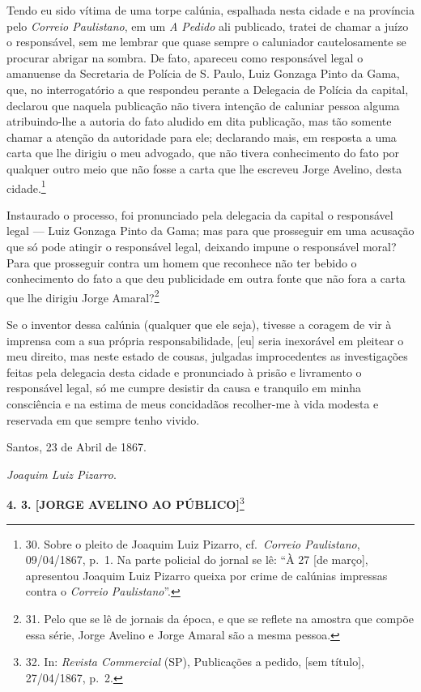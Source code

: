 Tendo eu sido vítima de uma torpe calúnia, espalhada nesta cidade e na
província pelo \emph{Correio Paulistano}, em um \emph{A Pedido} ali
publicado, tratei de chamar a juízo o responsável, sem me lembrar que
quase sempre o caluniador cautelosamente se procurar abrigar na sombra.
De fato, apareceu como responsável legal o amanuense da Secretaria de
Polícia de S. Paulo, Luiz Gonzaga Pinto da Gama, que, no interrogatório
a que respondeu perante a Delegacia de Polícia da capital, declarou que
naquela publicação não tivera intenção de caluniar pessoa alguma
atribuindo-lhe a autoria do fato aludido em dita publicação, mas tão
somente chamar a atenção da autoridade para ele; declarando mais, em
resposta a uma carta que lhe dirigiu o meu advogado, que não tivera
conhecimento do fato por qualquer outro meio que não fosse a carta que
lhe escreveu Jorge Avelino, desta cidade.\footnote{30. Sobre o pleito de
  Joaquim Luiz Pizarro, cf.~\emph{Correio Paulistano}, 09/04/1867, p.~1.
  Na parte policial do jornal se lê: ``À 27 {[}de março{]}, apresentou
  Joaquim Luiz Pizarro queixa por crime de calúnias impressas contra o
  \emph{Correio Paulistano}''.}

Instaurado o processo, foi pronunciado pela delegacia da capital o
responsável legal --- Luiz Gonzaga Pinto da Gama; mas para que
prosseguir em uma acusação que só pode atingir o responsável legal,
deixando impune o responsável moral? Para que prosseguir contra um homem
que reconhece não ter bebido o conhecimento do fato a que deu
publicidade em outra fonte que não fora a carta que lhe dirigiu Jorge
Amaral?\footnote{31. Pelo que se lê de jornais da época, e que se
  reflete na amostra que compõe essa série, Jorge Avelino e Jorge Amaral
  são a mesma pessoa.}

Se o inventor dessa calúnia (qualquer que ele seja), tivesse a coragem
de vir à imprensa com a sua própria responsabilidade, {[}eu{]} seria
inexorável em pleitear o meu direito, mas neste estado de cousas,
julgadas improcedentes as investigações feitas pela delegacia desta
cidade e pronunciado à prisão e livramento o responsável legal, só me
cumpre desistir da causa e tranquilo em minha consciência e na estima de
meus concidadãos recolher-me à vida modesta e reservada em que sempre
tenho vivido.

Santos, 23 de Abril de 1867.

\emph{Joaquim Luiz Pizarro}.

\textbf{4. 3. {[}JORGE AVELINO AO PÚBLICO{]}}\footnote{32. In:
  \emph{Revista Commercial} (SP), Publicações a pedido, {[}sem
  título{]}, 27/04/1867, p.~2.}


